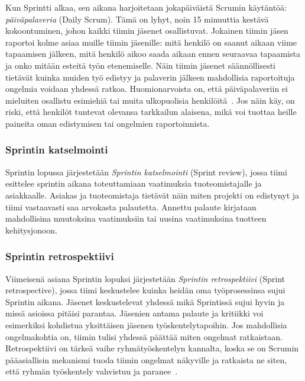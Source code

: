 \documentclass[finnish]{../tktltiki2}
\theoremstyle{definition}
\theoremstyle{remark}
\begin{document}
Kun Sprintti alkaa, sen aikana harjoitetaan jokapäiväistä Scrumin käytäntöä:
\emph{päiväpalaveria} (Daily Scrum). Tämä on lyhyt, noin 15 minuuttia kestävä kokoontuminen, johon
kaikki tiimin jäsenet osallistuvat. Jokainen tiimin jäsen raportoi kolme asiaa muille tiimin jäsenille:
mitä henkilö on saanut aikaan viime tapaamisen jälkeen, mitä henkilö
aikoo saada aikaan ennen seuraavaa tapaamista ja onko mitään
esteitä työn etenemiselle. Näin tiimin jäsenet säännöllisesti tietävät
kuinka muiden työ edistyy ja palaverin jälkeen mahdollisia raportoituja
ongelmia voidaan yhdessä ratkoa. Huomionarvoista on, että päiväpalaveriin ei mieluiten osallistu esimiehiä tai muita
ulkopuolisia henkilöitä~\cite{ScrumHandBook}. Jos näin käy, on riski,
että henkilöt tuntevat olevansa tarkkailun alaisena, mikä voi
tuottaa heille paineita oman edistymisen tai ongelmien raportoinnista.

\subsubsection{Sprintin katselmointi}

Sprintin lopussa järjestetään \emph{Sprintin katselmointi} (Sprint review), jossa tiimi esittelee sprintin aikana toteuttamiaan
vaatimuksia tuoteomistajalle ja asiakkaalle. Asiakas ja tuoteomistaja
tietävät näin miten projekti on edistynyt ja tiimi vastaavasti saa
arvokasta palautetta. Annettu palaute kirjataan mahdollisina muutoksina
vaatimuksiin tai uusina vaatimuksina tuotteen kehitysjonoon.

\subsubsection{Sprintin retrospektiivi}

Viimeisenä asiana Sprintin lopuksi järjestetään \emph{Sprintin retrospektiivi}
(Sprint retrospective), jossa tiimi keskustelee kuinka heidän
oma työprosessinsa sujui Sprintin aikana. Jäsenet
keskustelevat yhdessä mikä Sprintissä sujui hyvin ja missä
asioissa pitäisi parantaa. Jäsenien antama palaute ja kritiikki
voi esimerkiksi kohdistua yksittäisen jäsenen työskentelytapoihin.
Jos mahdollisia ongelmakohtia on, tiimin tulisi yhdessä päättää
miten ongelmat ratkaistaan. Retrospektiivi on tärkeä vaihe
ryhmätyöskentelyn kannalta, koska se on Scrumin pääasiallisin
mekanismi tuoda tiimin ongelmat näkyville ja ratkaista ne siten,
että ryhmän työskentely vahvistuu ja paranee~\cite{Scrumprimer}.\\
\end{document}
